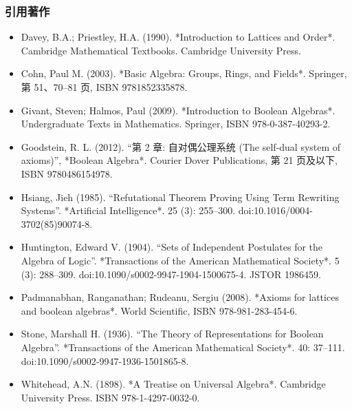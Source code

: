 \subsubsection{引用著作}
\begin{itemize}
\item Davey, B.A.; Priestley, H.A. (1990). *Introduction to Lattices and Order*. Cambridge Mathematical Textbooks. Cambridge University Press.
\item Cohn, Paul M. (2003). *Basic Algebra: Groups, Rings, and Fields*. Springer, 第 51、70–81 页, ISBN 9781852335878.
\item Givant, Steven; Halmos, Paul (2009). *Introduction to Boolean Algebras*. Undergraduate Texts in Mathematics. Springer, ISBN 978-0-387-40293-2.
\item Goodstein, R. L. (2012). “第 2 章: 自对偶公理系统 (The self-dual system of axioms)”, *Boolean Algebra*. Courier Dover Publications, 第 21 页及以下, ISBN 9780486154978.
\item Hsiang, Jieh (1985). “Refutational Theorem Proving Using Term Rewriting Systems”. *Artificial Intelligence*. 25 (3): 255–300. doi:10.1016/0004-3702(85)90074-8.
\item Huntington, Edward V. (1904). “Sets of Independent Postulates for the Algebra of Logic”. *Transactions of the American Mathematical Society*. 5 (3): 288–309. doi:10.1090/s0002-9947-1904-1500675-4. JSTOR 1986459.
\item Padmanabhan, Ranganathan; Rudeanu, Sergiu (2008). *Axioms for lattices and boolean algebras*. World Scientific, ISBN 978-981-283-454-6.
\item Stone, Marshall H. (1936). “The Theory of Representations for Boolean Algebra”. *Transactions of the American Mathematical Society*. 40: 37–111. doi:10.1090/s0002-9947-1936-1501865-8.
\item Whitehead, A.N. (1898). *A Treatise on Universal Algebra*. Cambridge University Press. ISBN 978-1-4297-0032-0.
\end{itemize}
